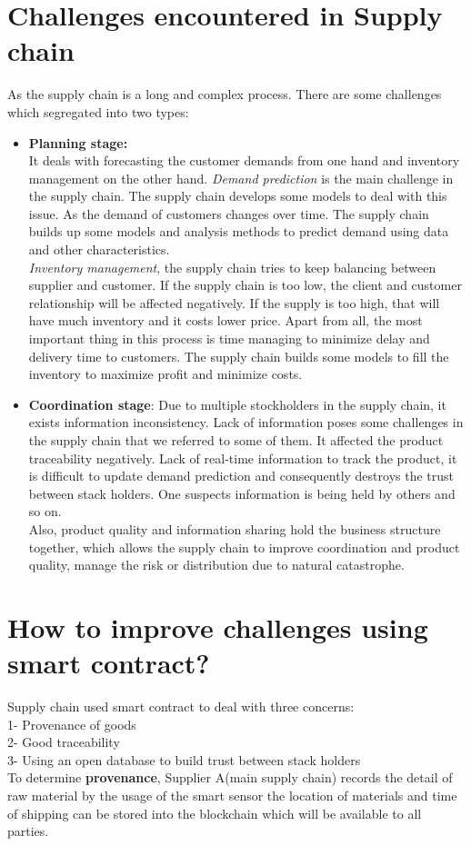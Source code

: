 \section{Challenges encountered in Supply chain}
As the supply chain is a long and complex process. There are some challenges which segregated into two types:\\
\begin{itemize}
	
	\item \textbf{Planning stage:}\\
	It deals with forecasting the customer demands from one hand and inventory management on the other hand. 
	\textit{Demand prediction} is the main challenge in the supply chain. The supply chain develops some models to deal with this issue. As the demand of customers changes over time.
	The supply chain builds up some models and analysis methods to predict demand using data and other characteristics.  \\
	\textit{Inventory management}, the supply chain tries to keep balancing between supplier and customer. If the supply chain is too low, the client and customer relationship will be affected negatively. If the supply is too high, that will have much inventory and it costs lower price. Apart from all, the most important thing in this process is time managing to minimize delay and delivery time to customers. The supply chain builds some models to fill the inventory to maximize profit and minimize costs.
	
	\item \textbf{Coordination stage}:
	Due to multiple stockholders in the supply chain, it exists information inconsistency. Lack of information poses some challenges in the supply chain that we referred to some of them. It affected the product traceability negatively. Lack of real-time information to track the product, it is difficult to update demand prediction and consequently destroys the trust between stack holders. One suspects information is being held by others and so on.\\ 
	Also, product quality and information sharing hold the business structure together, which allows the supply chain to improve coordination and product quality, manage the risk or distribution due to natural catastrophe\cite{Angwei}. 
\end{itemize}
\section{How to improve challenges using smart contract?}
Supply chain used smart contract to deal with three concerns:\\
1- Provenance of goods\\
2- Good traceability\\
3- Using an open database to build trust between stack holders\\
To determine \textbf{provenance}, Supplier A(main supply chain) records the detail of raw material by the usage of the smart sensor the location of materials and time of shipping can be stored into the blockchain which will be available to all parties.\\

